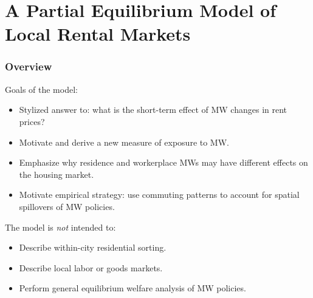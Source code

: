 \documentclass[aspectratio=169, t]{beamer}
\begin{document}
\section{A Partial Equilibrium Model of Local Rental Markets}

\begin{frame}
    \frametitle{Overview}
    
    Goals of the model:
	\begin{itemize}
		\item Stylized answer to: what is the short-term effect of MW changes in rent prices?
		\item Motivate and derive a new measure of exposure to MW.
		\item Emphasize why residence and workerplace MWs may have different effects on the housing market.
		\item Motivate empirical strategy: use commuting patterns to account for spatial spillovers of MW policies.
	\end{itemize}
	
	\pause
	\vspace{2mm}
	The model is \textit{not} intended to:
	\begin{itemize}
		\item Describe within-city residential sorting.
		\item Describe local labor or goods markets.
		\item Perform general equilibrium welfare analysis of MW policies.
	\end{itemize}
\end{frame}
\end{document}
